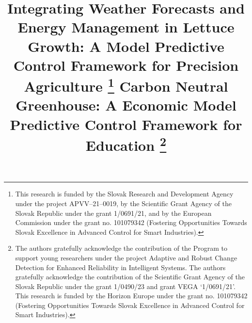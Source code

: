 \documentclass[conference]{IEEEtran}
\begin{document}
\title{Integrating Weather Forecasts and Energy Management in Lettuce Growth: A Model Predictive Control Framework for Precision Agriculture
    \thanks{This research is funded by the Slovak Research and Development Agency under the project APVV--21--0019, by the Scientific Grant Agency of the Slovak Republic under the grant 1/0691/21, and by the European Commission under the grant no. 101079342 (Fostering Opportunities Towards Slovak Excellence in Advanced Control for Smart Industries).}
}

\title{Carbon Neutral Greenhouse: A Economic Model Predictive Control Framework for Education
    \thanks{The authors gratefully acknowledge the contribution of the Program to support young researchers under the project Adaptive and Robust Change Detection for Enhanced Reliability in Intelligent Systems. The authors gratefully acknowledge the contribution of the Scientific Grant Agency of the Slovak Republic under the grant 1/0490/23 and grant VEGA `1/0691/21'. This research is funded by the Horizon Europe under the grant no. 101079342 (Fostering Opportunities Towards Slovak Excellence in Advanced Control for Smart Industries).}
}

\author{
}

\maketitle
\end{document}
